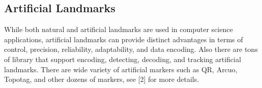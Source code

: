 \subsection{Artificial Landmarks}

While both natural and artificial landmarks are used in computer science applications, artificial landmarks can provide distinct advantages in terms of control, precision, reliability, adaptability, and data encoding. Also there are tons of library that support encoding, detecting, decoding, and tracking artificial landmarks. There are wide variety of artificial markers such as QR, Arcuo, Topotag, and other dozens of markers, see [2] for more details.

